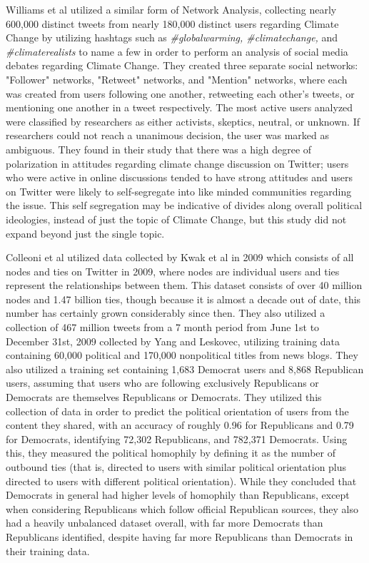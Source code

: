 \documentclass[journal]{IEEEtran}
\begin{document}
	Williams et al utilized a similar form of Network Analysis, collecting nearly 600,000 distinct tweets from nearly 180,000 distinct users regarding Climate Change by utilizing hashtags such as \textit{\#globalwarming, \#climatechange,} and \textit{\#climaterealists} to name a few in order to perform an analysis of social media debates regarding Climate Change. They created three separate social networks: "Follower" networks, "Retweet" networks, and "Mention" networks, where each was created from users following one another, retweeting each other's tweets, or mentioning one another in a tweet respectively. The most active users analyzed were classified by researchers as either activists, skeptics, neutral, or unknown. If researchers could not reach a unanimous decision, the user was marked as ambiguous. They found in their study that there was a high degree of polarization in attitudes regarding climate change discussion on Twitter; users who were active in online discussions tended to have strong attitudes and users on Twitter were likely to self-segregate into like minded communities regarding the issue. This self segregation may be indicative of divides along overall political ideologies, instead of just the topic of Climate Change, but this study did not expand beyond just the single topic. 
	
	Colleoni et al utilized data collected by Kwak et al in 2009 which consists of all nodes and ties on Twitter in 2009, where nodes are individual users and ties represent the relationships between them. This dataset consists of over 40 million nodes and 1.47 billion ties, though because it is almost a decade out of date, this number has certainly grown considerably since then. They also utilized a collection of 467 million tweets from a 7 month period from June 1st to December 31st, 2009 collected by Yang and Leskovec, utilizing training data containing 60,000 political and 170,000 nonpolitical titles from news blogs. They also utilized a training set containing 1,683 Democrat users and 8,868 Republican users, assuming that users who are following exclusively Republicans or Democrats are themselves Republicans or Democrats. They utilized this collection of data in order to predict the political orientation of users from the content they shared, with an accuracy of roughly 0.96 for Republicans and 0.79 for Democrats, identifying 72,302 Republicans, and 782,371 Democrats. Using this, they measured the political homophily by defining it as the number of outbound ties (that is, directed to users with similar political orientation plus directed to users with different political orientation). While they concluded that Democrats in general had higher levels of homophily than Republicans, except when considering Republicans which follow official Republican sources, they also had a heavily unbalanced dataset overall, with far more Democrats than Republicans identified, despite having far more Republicans than Democrats in their training data. 
	
\end{document}
